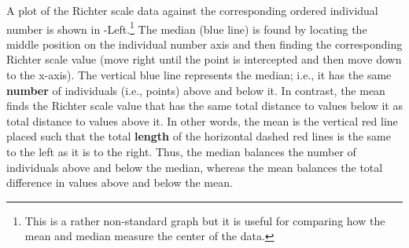 \documentclass[10pt,openany]{book}\usepackage[]{graphicx}\usepackage[]{color}
\begin{document}

A plot of the Richter scale data against the corresponding ordered individual number is shown in -Left.\footnote{This is a rather non-standard graph but it is useful for comparing how the mean and median measure the center of the data.}  The median (blue line) is found by locating the middle position on the individual number axis and then finding the corresponding Richter scale value (move right until the point is intercepted and then move down to the x-axis). The vertical blue line represents the median; i.e., it has the same \textbf{number} of individuals (i.e., points) above and below it. In contrast, the mean finds the Richter scale value that has the same total distance to values below it as total distance to values above it. In other words, the mean is the vertical red line placed such that the total \textbf{length} of the horizontal dashed red lines is the same to the left as it is to the right. Thus, the median balances the number of individuals above and below the median, whereas the mean balances the total difference in values above and below the mean.
\end{document}
